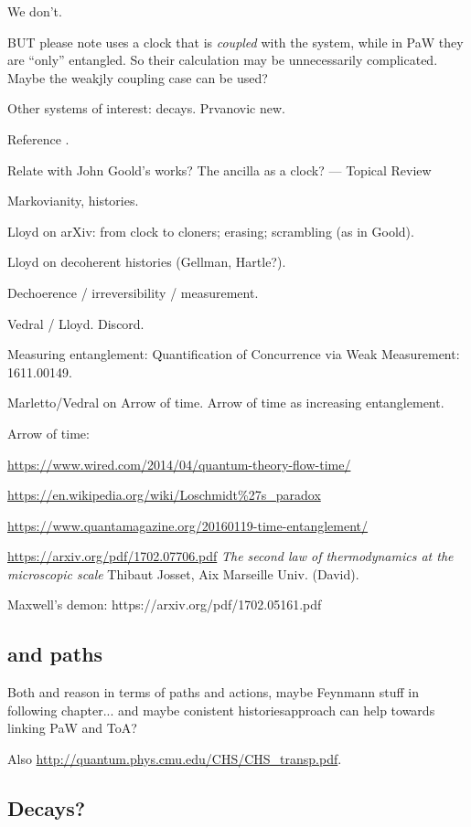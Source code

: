 We don't.

BUT please note \cite{YearsleyHalliwell_Clocks} uses a clock that is
\emph{coupled} with the system, while in PaW they are ``only'' entangled.
So their calculation may be unnecessarily complicated.
Maybe the weakjly coupling case can be used?

Other systems of interest: decays. Prvanovic new.

Reference \cite{ConnesRovelliThermo}.

Relate with John Goold's works? The ancilla as a clock? --- Topical Review

Markovianity, histories.

Lloyd on arXiv: from clock to cloners; erasing; scrambling (as in Goold).

Lloyd on decoherent histories (Gellman, Hartle?).

Dechoerence / irreversibility / measurement.

Vedral / Lloyd. Discord.

Measuring entanglement: Quantification of Concurrence via Weak Measurement: 1611.00149.

Marletto/Vedral on Arrow of time. Arrow of time as increasing entanglement.

Arrow of time:

\url{https://www.wired.com/2014/04/quantum-theory-flow-time/}

\url{https://en.wikipedia.org/wiki/Loschmidt%27s_paradox}

\url{https://www.quantamagazine.org/20160119-time-entanglement/}

\url{https://arxiv.org/pdf/1702.07706.pdf} \textit{The second law of thermodynamics at the microscopic scale}
Thibaut Josset,
Aix Marseille Univ. (David).

Maxwell's demon: https://arxiv.org/pdf/1702.05161.pdf

\subsection{and paths}

Both \cite{YearsleyHalliwell_Clocks} and \cite{Gambini_PW}
reason in terms of paths and actions, maybe Feynmann stuff
in following chapter... and maybe conistent historiesapproach can help
towards linking PaW and ToA?

Also \url{http://quantum.phys.cmu.edu/CHS/CHS_transp.pdf}.

\subsection{Decays?}

